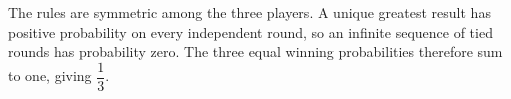 The rules are symmetric among the three players. A unique greatest result has positive probability on every independent round, so an infinite sequence of tied rounds has probability zero. The three equal winning probabilities therefore sum to one, giving $\boxed{\dfrac{1}{3}}$.
